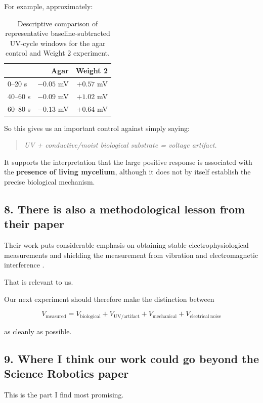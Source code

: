 \documentclass[11pt,a4paper]{article}
\begin{document}
For example, approximately:

\begin{table}[H]
\centering
\begin{tabular}{lrr}
\toprule
 & Agar & Weight 2 \\
\midrule
0--20 s & $-0.05$ mV & $+0.57$ mV \\
40--60 s & $-0.09$ mV & $+1.02$ mV \\
60--80 s & $-0.13$ mV & $+0.64$ mV \\
\bottomrule
\end{tabular}
\caption{Descriptive comparison of representative baseline-subtracted UV-cycle
windows for the agar control and Weight 2 experiment.}
\label{tab:agar_weight2}
\end{table}

So this gives us an important control against simply saying:

\begin{quote}
\emph{UV + conductive/moist biological substrate = voltage artifact.}
\end{quote}

It supports the interpretation that the large positive response is associated
with the \textbf{presence of living mycelium}, although it does not by itself
establish the precise biological mechanism.

\subsection{8. There is also a methodological lesson from their paper}

Their work puts considerable emphasis on obtaining stable electrophysiological
measurements and shielding the measurement from vibration and electromagnetic
interference \cite{Mishra2024}.

That is relevant to us.

Our next experiment should therefore make the distinction between

\[
V_{\mathrm{measured}}
=
V_{\mathrm{biological}}
+
V_{\mathrm{UV/artifact}}
+
V_{\mathrm{mechanical}}
+
V_{\mathrm{electrical\ noise}}
\]

as cleanly as possible.

\subsection{9. Where I think our work could go beyond the Science Robotics
paper}

This is the part I find most promising.
\end{document}
